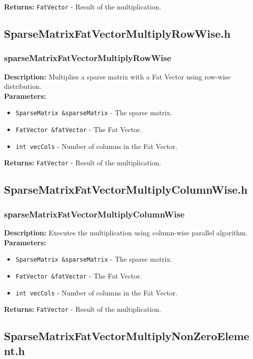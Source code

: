 \documentclass[12pt,oneside]{book} %
\begin{document}
\begin{subappendices}
    \textbf{Returns:} \texttt{FatVector} - Result of the multiplication.

    \subsection{SparseMatrixFatVectorMultiplyRowWise.h}
    \subsubsection{sparseMatrixFatVectorMultiplyRowWise}
    \textbf{Description:} Multiplies a sparse matrix with a Fat Vector using row-wise distribution.\\

    \textbf{Parameters:}
    \begin{itemize}
        \item \texttt{SparseMatrix \&sparseMatrix} - The sparse matrix.
        \item \texttt{FatVector \&fatVector} - The Fat Vector.
        \item \texttt{int vecCols} - Number of columns in the Fat Vector.
    \end{itemize}

    \textbf{Returns:} \texttt{FatVector} - Result of the multiplication.

    \subsection{SparseMatrixFatVectorMultiplyColumnWise.h}
    \subsubsection{sparseMatrixFatVectorMultiplyColumnWise}
    \textbf{Description:} Executes the multiplication using column-wise parallel algorithm.\\

    \textbf{Parameters:}
    \begin{itemize}
        \item \texttt{SparseMatrix \&sparseMatrix} - The sparse matrix.
        \item \texttt{FatVector \&fatVector} - The Fat Vector.
        \item \texttt{int vecCols} - Number of columns in the Fat Vector.
    \end{itemize}

    \textbf{Returns:} \texttt{FatVector} - Result of the multiplication.

    \subsection{SparseMatrixFatVectorMultiplyNonZeroElement.h}

\end{subappendices}
\end{document}
